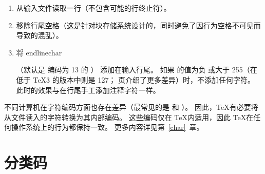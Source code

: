 \documentclass{book}
\begin{document}
\begin{enumerate}
\item 从输入文件读取一行（不包含可能的行终止符）。
\item 移除行尾空格（这是针对块存储系统设计的，同时避免了因行为空格不可见而导致的混乱）。
\item 将 \csterm endlinechar\par （默认是 \ascii 编码为 13 的 ）
      添加在输入行尾。
      如果  的值为负\label{append:elc}%
      或大于 255（在低于 \TeX 3 的版本中则是 127；\pageref{2vs3} 页介绍了更多差异）时，不添加任何字符。
      此时的效果与在行尾手工添加注释字符一样。
\end{enumerate}


不同计算机在字符编码方面也存在差异（最常见的是 \ascii 和 \ebcdic{}）。
因此，\TeX 有必要将从文件读入的字符转换为其内部编码。
这些编码仅在 \TeX 内适用，因此 \TeX 在任何操作系统上的行为都保持一致。
更多内容详见第~\ref{char}~章。

\section{分类码}
\end{document}
